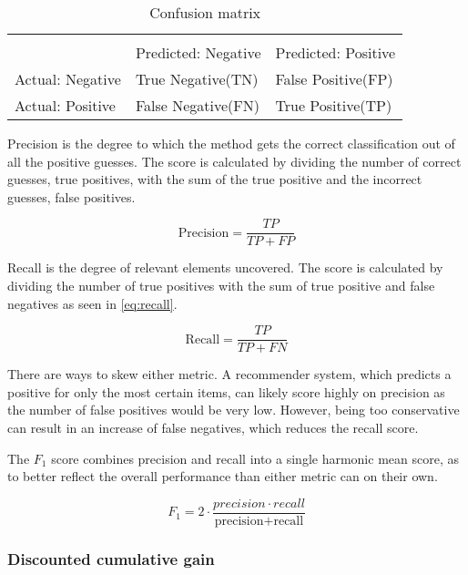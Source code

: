 \begin{table}[H]\label{tab:testandevaluation_confusionmatrix}
	\centering
	\begin{tabular}{ l|ll }
		\multicolumn{3}{l}{} \\
		& Predicted: Negative & Predicted: Positive \\ \hline
		Actual: Negative & True Negative(TN) & False Positive(FP) \\
		Actual: Positive & False Negative(FN) & True Positive(TP) \\ \hline
	\end{tabular}
	\caption{Confusion matrix}
\end{table}

Precision is the degree to which the method gets the correct classification out of all the positive guesses. The score is calculated by dividing the number of correct guesses, true positives, with the sum of the true positive and the incorrect guesses, false positives.

\begin{equation}\label{eq:precision}
	\text{Precision} = \frac{TP}{TP+FP}
\end{equation}

Recall is the degree of relevant elements uncovered. The score is calculated by dividing the number of true positives with the sum of true positive and false negatives as seen in \ref{eq:recall}.

\begin{equation}\label{eq:recall}
\text{Recall} = \frac{TP}{TP+FN}
\end{equation}

There are ways to skew either metric. A recommender system, which predicts a positive for only the most certain items, can likely score highly on precision as the number of false positives would be very low. However, being too conservative can result in an increase of false negatives, which reduces the recall score.

The $F_1$ score combines precision and recall into a single harmonic mean score, as to better reflect the overall performance than either metric can on their own.

\begin{equation}
	F_1 = 2 \cdot \frac{precision \cdot recall}{\text{precision} + \text{recall}}
\end{equation}

\subsubsection{Discounted cumulative gain}